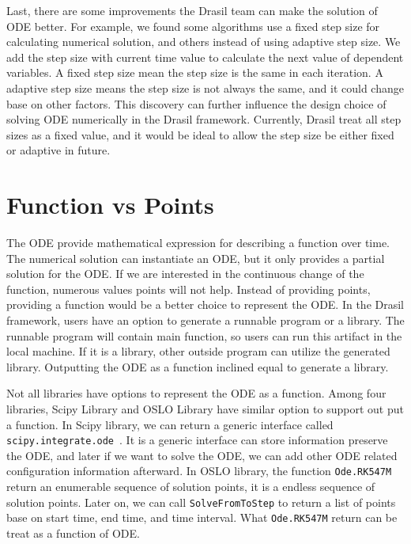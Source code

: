 Last, there are some improvements the Drasil team can make the solution of ODE better. For example, we found some algorithms use a fixed step size for calculating numerical solution, and others instead of using adaptive step size. We add the step size with current time value to calculate the next value of dependent variables. A fixed step size mean the step size is the same in each iteration. A adaptive step size means the step size is not always the same, and it could change base on other factors. This discovery can further influence the design choice of solving ODE numerically in the Drasil framework. Currently, Drasil treat all step sizes as a fixed value, and it would be ideal to allow the step size be either fixed or adaptive in future.

\section{Function vs Points}
The ODE provide mathematical expression for describing a function over time. The numerical solution can instantiate an ODE, but it only provides a partial solution for the ODE. If we are interested in the continuous change of the function, numerous values points will not help. Instead of providing points, providing a function would be a better choice to represent the ODE. In the Drasil framework, users have an option to generate a runnable program or a library. The runnable program will contain main function, so users can run this artifact in the local machine. If it is a library, other outside program can utilize the generated library. Outputting the ODE as a function inclined equal to generate a library.

Not all libraries have options to represent the ODE as a function. Among four libraries, Scipy Library and OSLO Library have similar option to support out put a function. In Scipy library, we can return a generic interface called \verb|scipy.integrate.ode|~\citep{scipyfun}. It is a generic interface can store information preserve the ODE, and later if we want to solve the ODE, we can add other ODE related configuration information afterward. In OSLO library, the function \verb|Ode.RK547M| return an enumerable sequence of solution points, it is a endless sequence of solution points. Later on, we can call \verb|SolveFromToStep| to return a list of points base on start time, end time, and time interval. What \verb|Ode.RK547M| return can be treat as a function of ODE.

